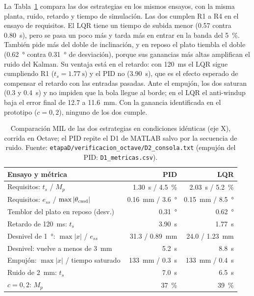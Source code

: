 La Tabla~\ref{tab:comparacion} compara las dos estrategias en los mismos ensayos, con la misma
planta, ruido, retardo y tiempo de simulación. Las dos cumplen R1 a R4 en el ensayo de
requisitos. El LQR tiene un tiempo de subida menor (\SI{0.57}{} contra
\SI{0.80}{\second}), pero se pasa un poco más y tarda más en entrar en la banda del
\SI{5}{\percent}. También pide más del doble de inclinación, y en reposo el plato tiembla el doble
(\SI{0.62}{\degree} contra \SI{0.31}{\degree} de desviación), porque sus ganancias más altas
amplifican el ruido del Kalman. Su ventaja está en el retardo: con \SI{120}{\milli\second} el LQR
sigue cumpliendo R1 ($t_s = \SI{1.77}{\second}$) y el PID no (\SI{3.90}{\second}), que es el
efecto esperado de compensar el retardo con las entradas pasadas. Ante el empujón, los dos
saturan (\SI{0.3}{} y \SI{0.4}{\second}) y no impiden que la bola llegue al borde; en el LQR el anti-windup baja
el error final de \SI{12.7}{} a \SI{11.6}{\milli\metre}. Con la ganancia identificada en el
prototipo ($c = 0{,}2$), ninguno de los dos cumple.

\begin{table}[!t]
\caption{Comparación MIL de las dos estrategias en condiciones idénticas (eje X), corrida en
Octave; el PID repite el D1 de MATLAB salvo por la secuencia de ruido. Fuente:
\texttt{etapaD/verificacion\_octave/D2\_consola.txt} (empujón del PID: \texttt{D1\_metricas.csv}).}
\label{tab:comparacion}
\centering
\footnotesize
\setlength{\tabcolsep}{3pt}
\begin{tabular}{@{}lrr@{}}
\toprule
\textbf{Ensayo y métrica} & \textbf{PID} & \textbf{LQR} \\
\midrule
Requisitos: $t_s$ / $M_p$ & \SI{1.30}{\second} / \SI{4.5}{\percent} & \SI{2.03}{\second} / \SI{5.2}{\percent} \\
Requisitos: $e_{ss}$ / $\max|\theta_{\mathrm{cmd}}|$ & \SI{0.16}{\milli\metre} / \SI{3.6}{\degree} & \SI{0.15}{\milli\metre} / \SI{8.5}{\degree} \\
Temblor del plato en reposo (desv.) & \SI{0.31}{\degree} & \SI{0.62}{\degree} \\
Retardo de \SI{120}{\milli\second}: $t_s$ & \SI{3.90}{\second} & \SI{1.77}{\second} \\
Desnivel de \SI{1}{\degree}: $\max|x|$ / $e_{ss}$ & \SI{31.3}{} / \SI{0.89}{\milli\metre} & \SI{24.0}{} / \SI{1.23}{\milli\metre} \\
Desnivel: vuelve a menos de \SI{3}{\milli\metre} & \SI{5.2}{\second} & \SI{8.8}{\second} \\
Empujón: $\max|x|$ / tiempo saturado & \SI{133}{\milli\metre} / \SI{0.3}{\second} & \SI{133}{\milli\metre} / \SI{0.4}{\second} \\
Ruido de \SI{2}{\milli\metre}: $t_s$ & \SI{7.0}{\second} & \SI{6.5}{\second} \\
$c = 0{,}2$: $M_p$ & \SI{37}{\percent} & \SI{39}{\percent} \\
\bottomrule
\end{tabular}
\end{table}

